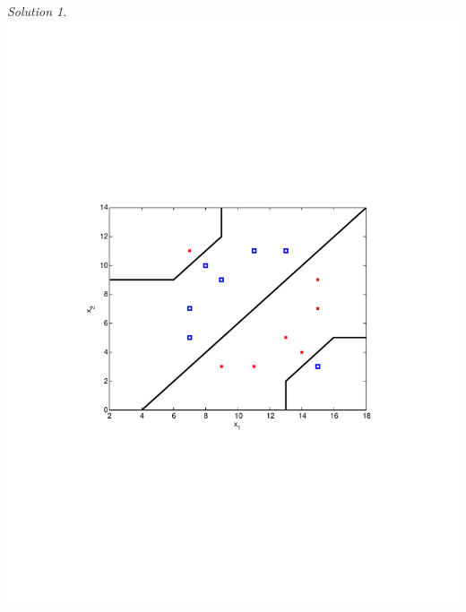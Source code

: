 \documentclass[a4paper,twoside=false,abstract=false,numbers=noenddot,
titlepage=false,headings=small,parskip=half,version=last]{scrartcl}
\theoremstyle{definition}
\theoremstyle{remark}
\newtheorem*{solution}{Solution}
\begin{document}
\begin{solution}
\includegraphics{exercise2.pdf}

\end{solution}
\end{document}
